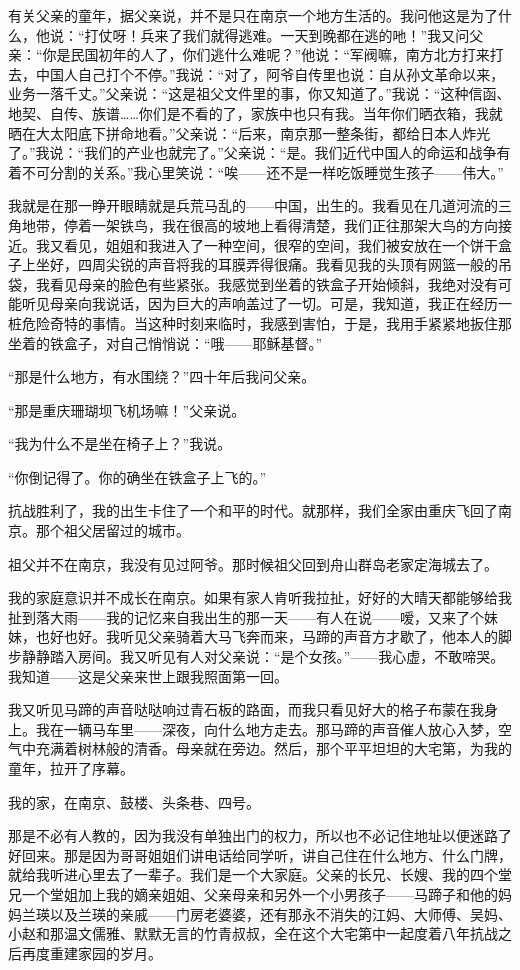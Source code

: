 \par 有关父亲的童年，据父亲说，并不是只在南京一个地方生活的。我问他这是为了什么，他说：“打仗呀！兵来了我们就得逃难。一天到晚都在逃的吔！”我又问父亲：“你是民国初年的人了，你们逃什么难呢？”他说：“军阀嘛，南方北方打来打去，中国人自己打个不停。”我说：“对了，阿爷自传里也说：自从孙文革命以来，业务一落千丈。”父亲说：“这是祖父文件里的事，你又知道了。”我说：“这种信函、地契、自传、族谱……你们是不看的了，家族中也只有我。当年你们晒衣箱，我就晒在大太阳底下拼命地看。”父亲说：“后来，南京那一整条街，都给日本人炸光了。”我说：“我们的产业也就完了。”父亲说：“是。我们近代中国人的命运和战争有着不可分割的关系。”我心里笑说：“唉——还不是一样吃饭睡觉生孩子——伟大。”
\par 我就是在那一睁开眼睛就是兵荒马乱的——中国，出生的。我看见在几道河流的三角地带，停着一架铁鸟，我在很高的坡地上看得清楚，我们正往那架大鸟的方向接近。我又看见，姐姐和我进入了一种空间，很窄的空间，我们被安放在一个饼干盒子上坐好，四周尖锐的声音将我的耳膜弄得很痛。我看见我的头顶有网篮一般的吊袋，我看见母亲的脸色有些紧张。我感觉到坐着的铁盒子开始倾斜，我绝对没有可能听见母亲向我说话，因为巨大的声响盖过了一切。可是，我知道，我正在经历一桩危险奇特的事情。当这种时刻来临时，我感到害怕，于是，我用手紧紧地扳住那坐着的铁盒子，对自己悄悄说：“哦——耶稣基督。”
\par “那是什么地方，有水围绕？”四十年后我问父亲。
\par “那是重庆珊瑚坝飞机场嘛！”父亲说。
\par “我为什么不是坐在椅子上？”我说。
\par “你倒记得了。你的确坐在铁盒子上飞的。”
\par 抗战胜利了，我的出生卡住了一个和平的时代。就那样，我们全家由重庆飞回了南京。那个祖父居留过的城市。
\par 祖父并不在南京，我没有见过阿爷。那时候祖父回到舟山群岛老家定海城去了。
\par 我的家庭意识并不成长在南京。如果有家人肯听我拉扯，好好的大晴天都能够给我扯到落大雨——我的记忆来自我出生的那一天——有人在说——嗳，又来了个妹妹，也好也好。我听见父亲骑着大马飞奔而来，马蹄的声音方才歇了，他本人的脚步静静踏入房间。我又听见有人对父亲说：“是个女孩。”——我心虚，不敢啼哭。我知道——这是父亲来世上跟我照面第一回。
\par 我又听见马蹄的声音哒哒响过青石板的路面，而我只看见好大的格子布蒙在我身上。我在一辆马车里——深夜，向什么地方走去。那马蹄的声音催人放心入梦，空气中充满着树林般的清香。母亲就在旁边。然后，那个平平坦坦的大宅第，为我的童年，拉开了序幕。
\par 我的家，在南京、鼓楼、头条巷、四号。
\par 那是不必有人教的，因为我没有单独出门的权力，所以也不必记住地址以便迷路了好回来。那是因为哥哥姐姐们讲电话给同学听，讲自己住在什么地方、什么门牌，就给我听进心里去了一辈子。我们是一个大家庭。父亲的长兄、长嫂、我的四个堂兄一个堂姐加上我的嫡亲姐姐、父亲母亲和另外一个小男孩子——马蹄子和他的妈妈兰瑛以及兰瑛的亲戚——门房老婆婆，还有那永不消失的江妈、大师傅、吴妈、小赵和那温文儒雅、默默无言的竹青叔叔，全在这个大宅第中一起度着八年抗战之后再度重建家园的岁月。
